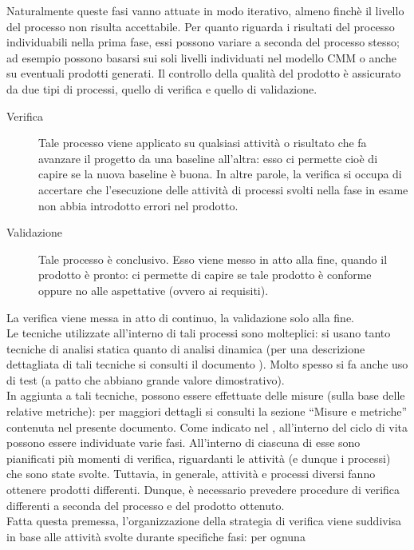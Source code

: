 		Naturalmente queste fasi vanno attuate in modo iterativo, almeno finchè il livello del processo non risulta accettabile.
		Per quanto riguarda i risultati del processo individuabili nella prima fase, essi possono variare a seconda del processo stesso; ad esempio possono basarsi sui soli livelli individuati nel modello CMM o anche su eventuali prodotti generati.
		Il controllo della qualità del prodotto è assicurato da due tipi di processi, quello di verifica e quello di validazione.
		\begin{description}
			\item[Verifica] Tale processo viene applicato su qualsiasi attività o risultato che fa avanzare il progetto da una baseline all'altra: esso 
			ci permette cioè di capire se la nuova baseline è buona. In altre parole, la verifica si occupa di accertare che l'esecuzione delle attività 
			di processi svolti nella fase in esame non abbia introdotto errori nel prodotto.
			\item[Validazione] Tale processo è conclusivo. Esso viene messo in atto alla fine, quando il prodotto è pronto: ci permette di capire se tale prodotto è conforme oppure no alle aspettative (ovvero ai requisiti).
		\end{description}
		La verifica viene messa in atto di continuo, la validazione solo alla fine.\\
		Le tecniche utilizzate all'interno di tali processi sono molteplici: si usano tanto tecniche di analisi statica quanto di analisi dinamica (per una descrizione dettagliata di tali tecniche si consulti il documento ). Molto spesso si fa anche uso di test (a patto che abbiano grande valore dimostrativo).\\
		In aggiunta a tali tecniche, possono essere effettuate delle misure (sulla base delle relative metriche): per maggiori dettagli si consulti la sezione “Misure e metriche” contenuta nel presente documento.
		Come indicato nel , all'interno del ciclo di vita possono essere individuate varie fasi. All'interno di ciascuna di esse sono pianificati più momenti di verifica, riguardanti le attività (e dunque i processi) che sono state svolte. Tuttavia, in generale, attività e processi diversi fanno ottenere prodotti differenti. Dunque, è necessario prevedere procedure di verifica differenti a seconda del processo e del prodotto ottenuto.\\
		Fatta questa premessa, l'organizzazione della strategia di verifica viene suddivisa in base alle attività svolte durante specifiche fasi: per ognuna 
